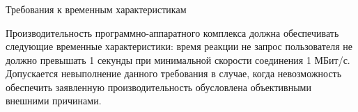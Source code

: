 \subsubsection{} Требования к временным характеристикам
\label{sec:analysis:research:req:timing}

Производительность программно-аппаратного комплекса должна обеспечивать следующие временные характеристики: время реакции не запрос пользователя не должно превышать 1 секунды при минимальной скорости соединения 1 МБит/с. Допускается невыполнение данного требования в случае, когда невозможность обеспечить заявленную производительность обусловлена объективными внешними причинами.